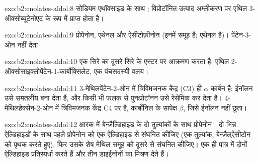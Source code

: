\begin{solution}{exo:b2:enolates-aldol:8}
सोडियम एथॉक्साइड के साथ ; विप्रोटॉनित उत्पाद
अम्लीकरण पर एथिल 3-ऑक्सोब्यूटेनोएट के रूप में प्राप्त होता है।
\end{solution}

\begin{solution}{exo:b2:enolates-aldol:9}
प्रोपेनोन, एथेनल और ऐसीटोफ़ीनोन (इनमें  समूह है; एथेनल  है)।
पेंटेन-3-ओन नहीं देता।
\end{solution}

\begin{solution}{exo:b2:enolates-aldol:10}
एक सिरे का  दूसरे सिरे के एस्टर पर आक्रमण करता है: एथिल 2-ऑक्सोसाइक्लोपेंटेन-1-कार्बोक्सिलेट, एक
पंचसदस्यी वलय।
\end{solution}

\begin{solution}{exo:b2:enolates-aldol:11}
3-मेथिलपेंटेन-2-ओन में त्रिविमजनक केंद्र (C3) ही $\alpha$ कार्बन है: ईनॉलन उसे समतलीय बना देता है, और
किसी भी फलक से पुनःप्रोटॉनन उसे रेसेमिक कर देता है। 4-मेथिलहेक्सेन-2-ओन में त्रिविमजनक केंद्र C4 पर है,
कार्बोनिल के सापेक्ष $\beta$, जिसे ईनॉलन नहीं छूता।
\end{solution}

\begin{solution}{exo:b2:enolates-aldol:12}
क्षारक में बेन्ज़ैल्डिहाइड के दो तुल्यांकों के साथ प्रोपेनोन। दो भिन्न ऐल्डिहाइडों के साथ पहले
प्रोपेनोन को एक ऐल्डिहाइड से संघनित कीजिए (एक तुल्यांक, बेन्ज़ैल्ऐसीटोन को पृथक करते हुए), फिर उसके
शेष मेथिल समूह को दूसरे से संघनित कीजिए। एक ही पात्र में दोनों ऐल्डिहाइड प्रतिस्पर्धा करते हैं और
तीन डाइईनोनों का मिश्रण देते हैं।
\end{solution}

